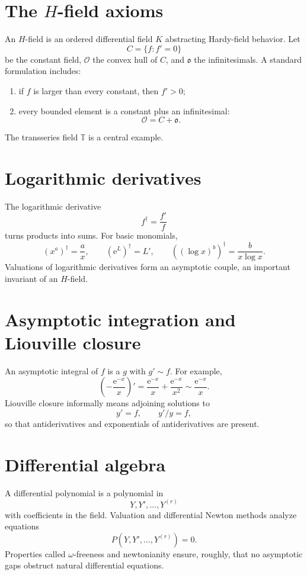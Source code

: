 \documentclass[11pt,oneside,openany]{book}
\newcommand{\T}{\mathbb{T}}
\newcommand{\e}{\mathrm{e}}
\theoremstyle{plain}
\theoremstyle{definition}
\theoremstyle{remark}
\begin{document}
\section{The \texorpdfstring{$H$}{H}-field axioms}
An $H$-field is an ordered differential field $K$ abstracting Hardy-field behavior. Let
\[
  C=\{f:f'=0\}
\]
be the constant field, $\mathcal O$ the convex hull of $C$, and $\mathfrak o$ the infinitesimals. A standard formulation includes:
\begin{enumerate}
  \item if $f$ is larger than every constant, then $f'>0$;
  \item every bounded element is a constant plus an infinitesimal:
  \[
    \mathcal O=C+\mathfrak o.
  \]
\end{enumerate}
The transseries field $\T$ is a central example.

\section{Logarithmic derivatives}
The logarithmic derivative
\[
  f^\dagger=\frac{f'}f
\]
turns products into sums. For basic monomials,
\[
  (x^a)^\dagger=\frac ax,
  \qquad
  (\e^L)^\dagger=L',
  \qquad
  ((\log x)^b)^\dagger=\frac{b}{x\log x}.
\]
Valuations of logarithmic derivatives form an asymptotic couple, an important invariant of an $H$-field.

\section{Asymptotic integration and Liouville closure}
An asymptotic integral of $f$ is a $g$ with $g'\sim f$. For example,
\[
  \left(-\frac{\e^{-x}}x\right)'
  =\frac{\e^{-x}}x+\frac{\e^{-x}}{x^2}
  \sim\frac{\e^{-x}}x.
\]
Liouville closure informally means adjoining solutions to
\[
  y'=f,
  \qquad y'/y=f,
\]
so that antiderivatives and exponentials of antiderivatives are present.

\section{Differential algebra}
A differential polynomial is a polynomial in
\[
  Y,Y',\ldots,Y^{(r)}
\]
with coefficients in the field. Valuation and differential Newton methods analyze equations
\[
  P(Y,Y',\ldots,Y^{(r)})=0.
\]
Properties called $\omega$-freeness and newtonianity ensure, roughly, that no asymptotic gaps obstruct natural differential equations.
\end{document}
